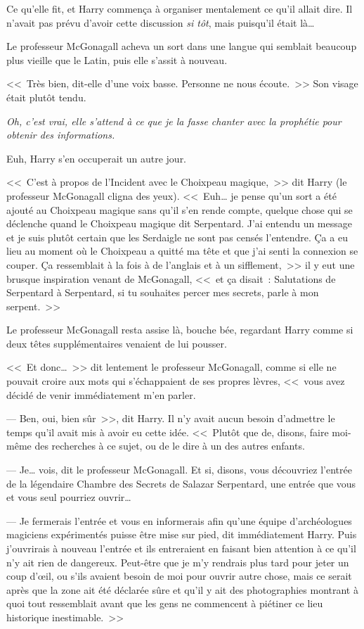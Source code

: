 Ce qu'elle fit, et Harry commença à organiser mentalement ce qu'il allait dire. Il n'avait pas prévu d'avoir cette discussion \emph{si tôt}, mais puisqu'il était là…

Le professeur McGonagall acheva un sort dans une langue qui semblait beaucoup plus vieille que le Latin, puis elle s'assit à nouveau.

<<~Très bien, dit-elle d'une voix basse. Personne ne nous écoute.~>> Son visage était plutôt tendu.

\emph{Oh, c'est vrai, elle s'attend à ce que je la fasse chanter avec la prophétie pour obtenir des informations.}

Euh, Harry s'en occuperait un autre jour.

<<~C'est à propos de l'Incident avec le Choixpeau magique,~>> dit Harry (le professeur McGonagall cligna des yeux). <<~Euh… je pense qu'un sort a été ajouté au Choixpeau magique sans qu'il s'en rende compte, quelque chose qui se déclenche quand le Choixpeau magique dit Serpentard. J'ai entendu un message et je suis plutôt certain que les Serdaigle ne sont pas censés l'entendre. Ça a eu lieu au moment où le Choixpeau a quitté ma tête et que j'ai senti la connexion se couper. Ça ressemblait à la fois à de l'anglais et à un sifflement,~>> il y eut une brusque inspiration venant de McGonagall, <<~et ça disait~: Salutations de Serpentard à Serpentard, si tu souhaites percer mes secrets, parle à mon serpent.~>>

Le professeur McGonagall resta assise là, bouche bée, regardant Harry comme si deux têtes supplémentaires venaient de lui pousser.

<<~Et donc…~>> dit lentement le professeur McGonagall, comme si elle ne pouvait croire aux mots qui s'échappaient de ses propres lèvres, <<~vous avez décidé de venir immédiatement m'en parler.

--- Ben, oui, bien sûr~>>, dit Harry. Il n'y avait aucun besoin d'admettre le temps qu'il avait mis à avoir eu cette idée. <<~Plutôt que de, disons, faire moi-même des recherches à ce sujet, ou de le dire à un des autres enfants.

--- Je… vois, dit le professeur McGonagall. Et si, disons, vous découvriez l'entrée de la légendaire Chambre des Secrets de Salazar Serpentard, une entrée que vous et vous seul pourriez ouvrir…

--- Je fermerais l'entrée et vous en informerais afin qu'une équipe d'archéologues magiciens expérimentés puisse être mise sur pied, dit immédiatement Harry. Puis j'ouvrirais à nouveau l'entrée et ils entreraient en faisant bien attention à ce qu'il n'y ait rien de dangereux. Peut-être que je m'y rendrais plus tard pour jeter un coup d'œil, ou s'ils avaient besoin de moi pour ouvrir autre chose, mais ce serait après que la zone ait été déclarée sûre et qu'il y ait des photographies montrant à quoi tout ressemblait avant que les gens ne commencent à piétiner ce lieu historique inestimable.~>>

